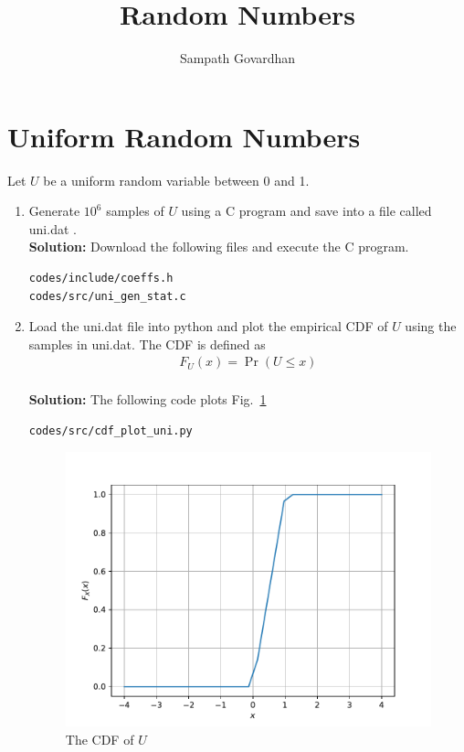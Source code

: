 \documentclass[journal,10pt,twocolumn]{article}
\newcommand\figref{Fig.~\ref}
\providecommand{\pr}[1]{\ensuremath{\Pr\left(#1\right)}}
\newcommand{\solution}{\noindent \textbf{Solution: }}
\begin{document}
\title{Random Numbers}
\author{Sampath Govardhan}

\maketitle

\tableofcontents

\bigskip

\fi

\section{Uniform Random Numbers}
Let $U$ be a uniform random variable between 0 and 1.
\begin{enumerate}
\item Generate $10^6$ samples of $U$ using a C program and save into a file called uni.dat .
\label{prob:uni_gen}
\\
\solution Download the following files and execute the  C program.
\begin{lstlisting}
codes/include/coeffs.h
codes/src/uni_gen_stat.c
\end{lstlisting}

%
\item
Load the uni.dat file into python and plot the empirical CDF of $U$ using the samples in uni.dat. The CDF is defined as
\begin{align}
F_{U}(x) = \pr{U \le x}
\end{align}
\\
\solution  The following code plots \figref{fig:uni_cdf}
\begin{lstlisting}
codes/src/cdf_plot_uni.py
\end{lstlisting}
\begin{figure}[h]
\centering
\includegraphics[width=\columnwidth]{./chapters/ch2/figs/uni_cdf.pdf}
\caption{The CDF of $U$}
\label{fig:uni_cdf}
\end{figure}


\end{enumerate}
\end{document}
